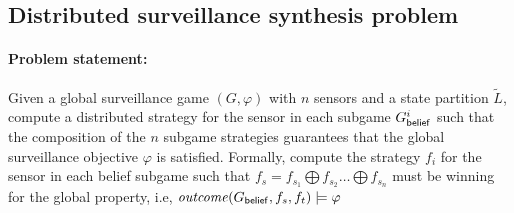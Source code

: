 \subsection{Distributed surveillance synthesis problem}
\paragraph*{\textbf{Problem statement: }}Given a global surveillance game $(G,\varphi)$ with $n$ sensors and a state partition $\widetilde{L}$, compute a distributed strategy for the sensor in each subgame $G^i_{\mathsf{belief}}$ such that the composition of the $n$ subgame strategies guarantees that the global surveillance objective $\varphi$ is satisfied. Formally, compute the strategy $f_i$ for the sensor in each belief subgame such that $f_s = f_{s_1} \bigoplus f_{s_2} \dots \bigoplus f_{s_n}$ must be winning for the global property, i.e, $\mathit{outcome}(G_{\mathsf{belief}},f_{s},f_{t}) \models \varphi$





